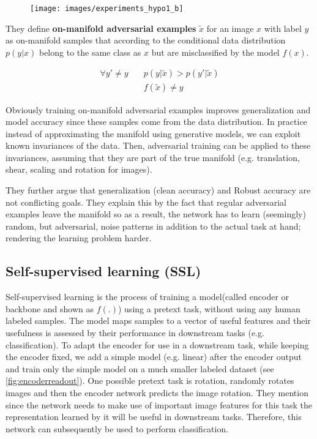 \documentclass[../thesis.tex]{subfiles}
\begin{document}
	\begin{figure}
		\centering
		\texttt{[image: images/experiments\_hypo1\_b]}
		\caption{}
		\label{fig:experimentshypo1b}
	\end{figure}
	
	
	They define \textbf{on-manifold adversarial examples} $\tilde{x}$ for an image $x$ with label $y$ as on-manifold samples that according to the conditional data distribution $p(y|x)$ belong to the same class as $x$ but are misclassified by the model $f(x)$. 
	
	\begin{align}
	\forall y' \neq  y \quad &p(y | \tilde{x}) > p(y' | \tilde{x}) \\	
	&f(\tilde{x}) \neq y
	\end{align}
	
	Obviously training on-manifold adversarial examples improves generalization and model accuracy since these samples come from the data distribution. In practice instead of approximating the manifold using generative models, we can exploit known invariances of the data. Then, adversarial training can be applied to these invariances, assuming that they are part of the true manifold (e.g. translation, shear, scaling and rotation for images).
	
	They further argue that generalization (clean accuracy) and Robust accuracy are not conflicting goals. They explain this by the fact that regular adversarial examples leave the manifold so as a result, the network has to learn (seemingly) random, but adversarial, noise patterns in addition to the actual task at hand; rendering the
	learning problem harder. 
	
	
	

	\subsection{Self-supervised learning (SSL)}
	\label{sec:ssl_methods}
	Self-supervised learning is the process of training a model(called encoder or backbone and shown as $f(.)$) using a pretext task, without using any human labeled samples. The model maps samples to a vector of useful features and their usefulness is assessed by their performance in downstream tasks (e.g. classification). To adapt the encoder for use in a downstream task, while keeping the encoder fixed, we add a simple model (e.g. linear) after the encoder output and train only the simple model on a much smaller labeled dataset (see \ref{fig:encoderreadout}). One possible pretext task is rotation, \cite{rotation_gidaris_unsupervised_2018} randomly rotates images and then the encoder network predicts the image rotation. They mention since the network needs to make use of important image features for this task the representation learned by it will be useful in downstream tasks. Therefore, this network can subsequently be used to perform classification. 
	
\end{document}
